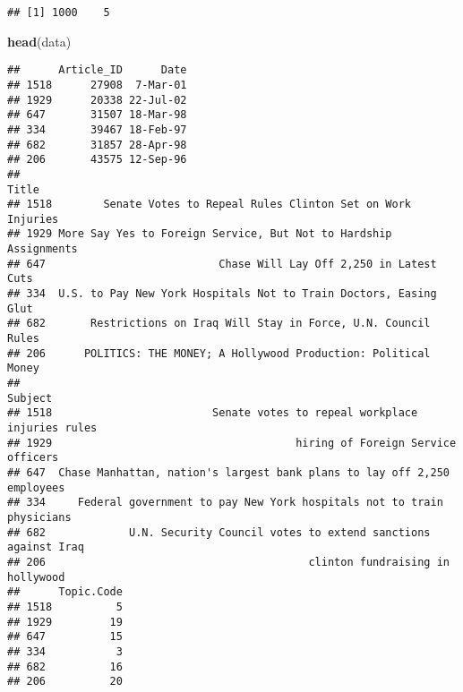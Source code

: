 \documentclass[11pt,]{article}
\newenvironment{Shaded}{\begin{snugshade}}{\end{snugshade}}
\newcommand{\KeywordTok}[1]{\textcolor[rgb]{0.13,0.29,0.53}{\textbf{#1}}}
\newcommand{\DataTypeTok}[1]{\textcolor[rgb]{0.13,0.29,0.53}{#1}}
\newcommand{\StringTok}[1]{\textcolor[rgb]{0.31,0.60,0.02}{#1}}
\newcommand{\OtherTok}[1]{\textcolor[rgb]{0.56,0.35,0.01}{#1}}
\newcommand{\OperatorTok}[1]{\textcolor[rgb]{0.81,0.36,0.00}{\textbf{#1}}}
\newcommand{\NormalTok}[1]{#1}
\begin{document}
\begin{verbatim}
## [1] 1000    5
\end{verbatim}

\begin{Shaded}
\begin{Highlighting}[]
\KeywordTok{head}\NormalTok{(data)}
\end{Highlighting}
\end{Shaded}

\begin{verbatim}
##      Article_ID      Date
## 1518      27908  7-Mar-01
## 1929      20338 22-Jul-02
## 647       31507 18-Mar-98
## 334       39467 18-Feb-97
## 682       31857 28-Apr-98
## 206       43575 12-Sep-96
##                                                                 Title
## 1518        Senate Votes to Repeal Rules Clinton Set on Work Injuries
## 1929 More Say Yes to Foreign Service, But Not to Hardship Assignments
## 647                           Chase Will Lay Off 2,250 in Latest Cuts
## 334  U.S. to Pay New York Hospitals Not to Train Doctors, Easing Glut
## 682       Restrictions on Iraq Will Stay in Force, U.N. Council Rules
## 206      POLITICS: THE MONEY; A Hollywood Production: Political Money
##                                                                      Subject
## 1518                         Senate votes to repeal workplace injuries rules
## 1929                                      hiring of Foreign Service officers
## 647  Chase Manhattan, nation's largest bank plans to lay off 2,250 employees
## 334     Federal government to pay New York hospitals not to train physicians
## 682             U.N. Security Council votes to extend sanctions against Iraq
## 206                                         clinton fundraising in hollywood
##      Topic.Code
## 1518          5
## 1929         19
## 647          15
## 334           3
## 682          16
## 206          20
\end{verbatim}

\begin{Shaded}
\end{Shaded}
\end{document}
